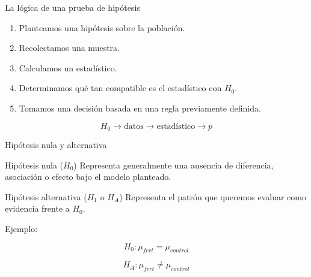 \documentclass[aspectratio=169,11pt]{beamer}
\begin{document}
\begin{frame}{La lógica de una prueba de hipótesis}

\begin{enumerate}
    \item Planteamos una hipótesis sobre la población.
    \item Recolectamos una muestra.
    \item Calculamos un estadístico.
    \item Determinamos qué tan compatible es el estadístico con $H_0$.
    \item Tomamos una decisión basada en una regla previamente definida.
\end{enumerate}

\vspace{0.4cm}

\begin{center}
\Large
\[
\boxed{
H_0
\longrightarrow
\text{datos}
\longrightarrow
\text{estadístico}
\longrightarrow
p
}
\]
\end{center}

\end{frame}

\begin{frame}{Hipótesis nula y alternativa}

\begin{block}{Hipótesis nula ($H_0$)}
Representa generalmente una ausencia de diferencia, asociación o efecto
bajo el modelo planteado.
\end{block}

\begin{block}{Hipótesis alternativa ($H_1$ o $H_A$)}
Representa el patrón que queremos evaluar como evidencia frente a $H_0$.
\end{block}

\vspace{0.3cm}

Ejemplo:

\[
H_0:\mu_{fert}=\mu_{control}
\]

\[
H_A:\mu_{fert}\neq\mu_{control}
\]

\end{frame}
\end{document}
